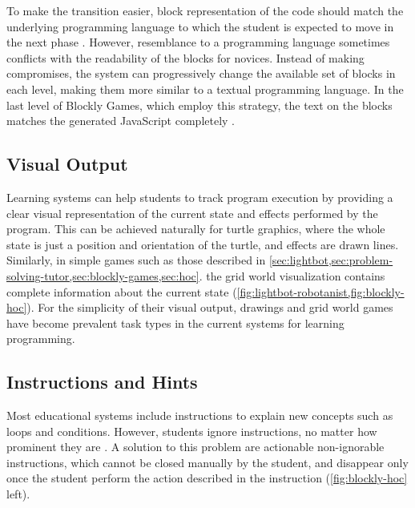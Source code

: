 To make the transition easier, block representation of the code
  should match the underlying programming language
  to which the student is expected to move in the next phase
  \cite{challenges-of-blocks-based-environments}.
However, resemblance to a programming language sometimes
  conflicts with the readability of the blocks for novices.
Instead of making compromises,
  the system can progressively change the available set of blocks in each level,
  making them more similar to a textual programming language.
In the last level of Blockly Games, which employ this strategy,
  the text on the blocks matches the generated JavaScript completely
  \cite{blockly-10-things}.



\subsection{Visual Output}
\label{sec:visual-output}

Learning systems can help students to track program execution
  by providing a clear visual representation of the current state
  and effects performed by the program.
This can be achieved naturally for turtle graphics,
  where the whole state is just a position and orientation of the turtle,
  and effects are drawn lines.
Similarly, in simple games such as those described in
  \cref{sec:lightbot,sec:problem-solving-tutor,sec:blockly-games,sec:hoc}.
  the grid world visualization contains complete information about the current
  state (\cref{fig:lightbot-robotanist,fig:blockly-hoc}).
For the simplicity of their visual output,
  drawings and grid world games have become prevalent task types
  in the current systems for learning programming.

\subsection{Instructions and Hints}
\label{sec:instructions-and-hints}

Most educational systems include instructions
  to explain new concepts such as loops and conditions.
However, students ignore instructions,
  no matter how prominent they are \cite{blockly-10-things}.
A solution to this problem are actionable non-ignorable instructions,
  which cannot be closed manually by the student, and disappear only once the
  student perform the action described in the instruction
  (\cref{fig:blockly-hoc} left).

